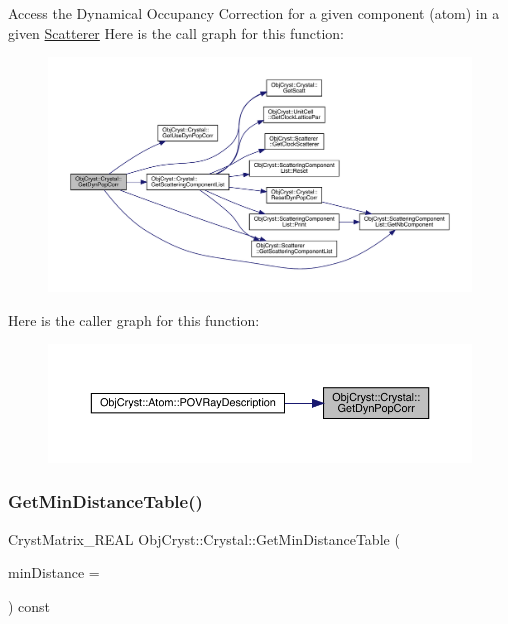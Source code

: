 Access the Dynamical Occupancy Correction for a given component (atom) in a given \mbox{\hyperlink{class_obj_cryst_1_1_scatterer}{Scatterer}} Here is the call graph for this function\+:
\nopagebreak
\begin{figure}[H]
\begin{center}
\leavevmode
\includegraphics[width=350pt]{class_obj_cryst_1_1_crystal_a9328fa012a60adf6b2b17dcfba9f6906_cgraph}
\end{center}
\end{figure}
Here is the caller graph for this function\+:
\nopagebreak
\begin{figure}[H]
\begin{center}
\leavevmode
\includegraphics[width=350pt]{class_obj_cryst_1_1_crystal_a9328fa012a60adf6b2b17dcfba9f6906_icgraph}
\end{center}
\end{figure}
\mbox{\label{class_obj_cryst_1_1_crystal_a26c8dfab558f79522c3ab31babd4720e}} 
\subsubsection{\texorpdfstring{GetMinDistanceTable()}{GetMinDistanceTable()}}
{\footnotesize\ttfamily Cryst\+Matrix\+\_\+\+R\+E\+AL Obj\+Cryst\+::\+Crystal\+::\+Get\+Min\+Distance\+Table (\begin{DoxyParamCaption}\item[{const R\+E\+AL}]{min\+Distance = {} }\end{DoxyParamCaption}) const}



